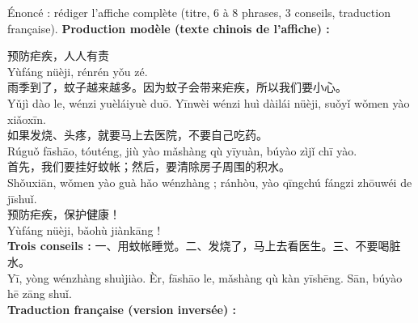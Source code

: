\documentclass[11pt]{article}
\begin{document}
\begin{exoresolu}
Énoncé : rédiger l'affiche complète (titre, 6 à 8 phrases, 3 conseils, traduction française).
\tcblower
\textbf{Production modèle (texte chinois de l'affiche) :}

预防疟疾，人人有责\\
Yùfáng nüèji, rénrén yǒu zé.\\[4pt]
雨季到了，蚊子越来越多。因为蚊子会带来疟疾，所以我们要小心。\\
Yǔjì dào le, wénzi yuèláiyuè duō. Yīnwèi wénzi huì dàilái nüèji, suǒyǐ wǒmen yào xiǎoxīn.\\
如果发烧、头疼，就要马上去医院，不要自己吃药。\\
Rúguǒ fāshāo, tóuténg, jiù yào mǎshàng qù yīyuàn, búyào zìjǐ chī yào.\\
首先，我们要挂好蚊帐；然后，要清除房子周围的积水。\\
Shǒuxiān, wǒmen yào guà hǎo wénzhàng ; ránhòu, yào qīngchú fángzi zhōuwéi de jīshuǐ.\\
预防疟疾，保护健康！\\
Yùfáng nüèji, bǎohù jiànkāng !\\[4pt]
\textbf{Trois conseils :} 一、用蚊帐睡觉。二、发烧了，马上去看医生。三、不要喝脏水。\\
Yī, yòng wénzhàng shuìjiào. Èr, fāshāo le, mǎshàng qù kàn yīshēng. Sān, búyào hē zāng shuǐ.\\[6pt]
\textbf{Traduction française (version inversée) :}


\end{exoresolu}
\end{document}
